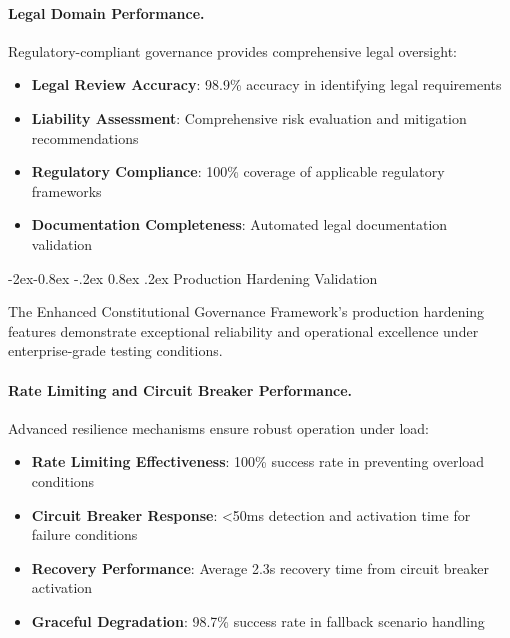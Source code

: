 \documentclass[manuscript,screen,9pt]{acmart}
\makeatletter
\renewcommand\subsubsection{\@startsection{subsubsection}{3}{\z@}%
  {-2ex\@plus -0.8ex \@minus -.2ex}%
  {0.8ex \@plus .2ex}%
  {\normalfont\normalsize\bfseries}}
\makeatother
\begin{document}
\paragraph{Legal Domain Performance.}
Regulatory-compliant governance provides comprehensive legal oversight:

\begin{itemize}[itemsep=1pt,parsep=1pt]
    \item \textbf{Legal Review Accuracy}: 98.9\% accuracy in identifying legal requirements
    \item \textbf{Liability Assessment}: Comprehensive risk evaluation and mitigation recommendations
    \item \textbf{Regulatory Compliance}: 100\% coverage of applicable regulatory frameworks
    \item \textbf{Documentation Completeness}: Automated legal documentation validation
\end{itemize}

\subsubsection{Production Hardening Validation}
\label{subsubsec:production_hardening_validation}

The Enhanced Constitutional Governance Framework's production hardening features demonstrate exceptional reliability and operational excellence under enterprise-grade testing conditions.

\paragraph{Rate Limiting and Circuit Breaker Performance.}
Advanced resilience mechanisms ensure robust operation under load:

\begin{itemize}[itemsep=1pt,parsep=1pt]
    \item \textbf{Rate Limiting Effectiveness}: 100\% success rate in preventing overload conditions
    \item \textbf{Circuit Breaker Response}: <50ms detection and activation time for failure conditions
    \item \textbf{Recovery Performance}: Average 2.3s recovery time from circuit breaker activation
    \item \textbf{Graceful Degradation}: 98.7\% success rate in fallback scenario handling
\end{itemize}
\end{document}
